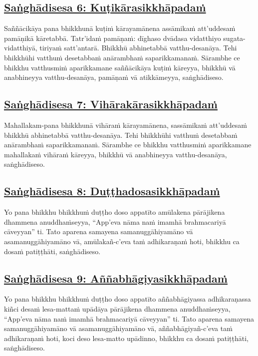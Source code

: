 \subsection*{\hyperref[comm6]{Saṅghādisesa 6: Kuṭikārasikkhāpadaṁ}}
\label{sd6}
Saññācikāya pana bhikkhunā kuṭiṁ kārayamānena assāmikaṁ att’uddesaṁ pamāṇikā kāretabbā. Tatr’idaṁ pamāṇaṁ: dīghaso dvādasa vidatthiyo sugata-vidatthiyā, tiriyaṁ satt’antarā. Bhikkhū abhinetabbā vatthu-desanāya. Tehi bhikkhūhi vatthuṁ desetabbaṁ anārambhaṁ saparikkamanaṁ. Sārambhe ce bhikkhu vatthusmiṁ aparikkamane saññācikāya kuṭiṁ kāreyya, bhikkhū vā anabhineyya vatthu-desanāya, pamāṇaṁ vā atikkāmeyya, saṅghādiseso.

\subsection*{\hyperref[comm7]{Saṅghādisesa 7: Vihārakārasikkhāpadaṁ}}
\label{sd7}
Mahallakam-pana bhikkhunā vihāraṁ kārayamānena, sassāmikaṁ att’uddesaṁ bhikkhū abhinetabbā vatthu-desanāya. Tehi bhikkhūhi vatthuṁ desetabbaṁ anārambhaṁ saparikkamanaṁ. Sārambhe ce bhikkhu vatthusmiṁ aparikkamane mahallakaṁ vihāraṁ kāreyya, bhikkhū vā anabhineyya vatthu-desanāya, saṅghādiseso.

\subsection*{\hyperref[comm8]{Saṅghādisesa 8: Duṭṭhadosasikkhāpadaṁ}}
\label{sd8}
Yo pana bhikkhu bhikkhuṁ duṭṭho doso appatīto amūlakena pārājikena dhammena anuddhaṁseyya, “App’eva nāma naṁ imamhā brahmacariyā cāveyyan” ti. Tato aparena samayena samanuggāhiyamāno vā asamanuggāhiyamāno vā, amūlakañ-c’eva taṁ adhikaraṇaṁ hoti, bhikkhu ca dosaṁ patiṭṭhāti, saṅghādiseso.

\subsection*{\hyperref[comm9]{Saṅghādisesa 9: Aññabhāgiyasikkhāpadaṁ}}
\label{sd9}
Yo pana bhikkhu bhikkhuṁ duṭṭho doso appatīto aññabhāgiyassa adhikaraṇassa kiñci desaṁ lesa-mattaṁ upādāya pārājikena dhammena anuddhaṁseyya, “App’eva nāma naṁ imamhā brahmacariyā cāveyyan” ti. Tato aparena samayena samanuggāhiyamāno vā asamanuggāhiyamāno vā, aññabhāgiyañ-c’eva taṁ adhikaraṇaṁ hoti, koci deso lesa-matto upādinno, bhikkhu ca dosaṁ patiṭṭhāti, saṅghādiseso.

